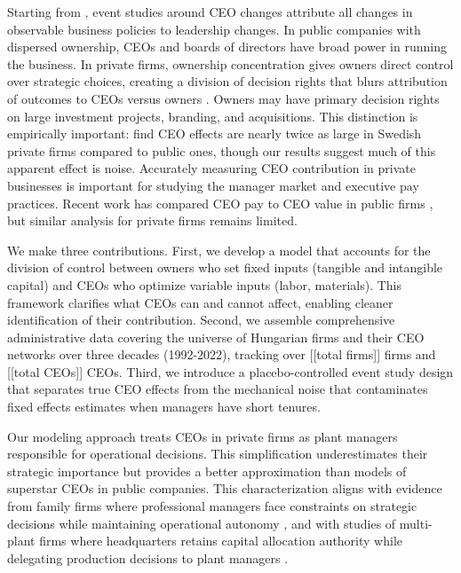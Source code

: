 \documentclass[11pt,a4paper]{article}
\begin{document}
Starting from \citet{Bertrand2003-io}, event studies around CEO changes attribute all changes in observable business policies to leadership changes. In public companies with dispersed ownership, CEOs and boards of directors have broad power in running the business. In private firms, ownership concentration gives owners direct control over strategic choices, creating a division of decision rights that blurs attribution of outcomes to CEOs versus owners \citep{fama1983separation, jensen1976theory, burkart2003family}. Owners may have primary decision rights on large investment projects, branding, and acquisitions. This distinction is empirically important: \citet{quigley2022ceo} find CEO effects are nearly twice as large in Swedish private firms compared to public ones, though our results suggest much of this apparent effect is noise. Accurately measuring CEO contribution in private businesses is important for studying the manager market and executive pay practices. Recent work has compared CEO pay to CEO value in public firms \citep{tervio2008difference,gabaix2008ceo}, but similar analysis for private firms remains limited.

We make three contributions. First, we develop a model that accounts for the division of control between owners who set fixed inputs (tangible and intangible capital) and CEOs who optimize variable inputs (labor, materials). This framework clarifies what CEOs can and cannot affect, enabling cleaner identification of their contribution. Second, we assemble comprehensive administrative data covering the universe of Hungarian firms and their CEO networks over three decades (1992-2022), tracking over [[total firms]] firms and [[total CEOs]] CEOs. Third, we introduce a placebo-controlled event study design that separates true CEO effects from the mechanical noise that contaminates fixed effects estimates when managers have short tenures.

Our modeling approach treats CEOs in private firms as plant managers responsible for operational decisions. This simplification underestimates their strategic importance but provides a better approximation than models of superstar CEOs in public companies. This characterization aligns with evidence from family firms where professional managers face constraints on strategic decisions while maintaining operational autonomy \citep{zellweger2012managing}, and with studies of multi-plant firms where headquarters retains capital allocation authority while delegating production decisions to plant managers \citep{bloom2012americans}.
\end{document}
